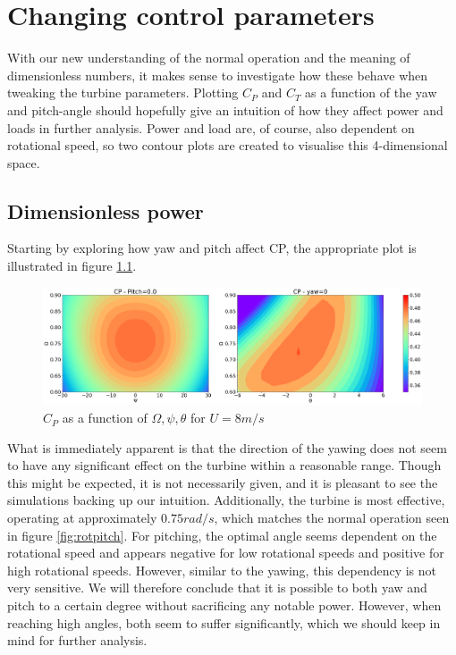 \chapter{Changing control parameters}

With our new understanding of the normal operation and the meaning of dimensionless numbers, it makes sense to investigate how these behave when tweaking the turbine parameters. Plotting $C_P$ and $C_T$ as a function of the yaw and pitch-angle should hopefully give an intuition of how they affect power and loads in further analysis. Power and load are, of course, also dependent on rotational speed, so two contour plots are created to visualise this 4-dimensional space. 

\section{Dimensionless power}
\label{dimensionless_power}

Starting by exploring how yaw and pitch affect CP, the appropriate plot is illustrated in figure \ref{fig:cpcontour}.

\begin{figure}[H]
    \centering
    \includegraphics[scale=0.23]{Illustrations/cpcontour.png}
    \caption{$C_P$ as a function of $\Omega, \psi, \theta$ for $U=8 m/s$}
    \label{fig:cpcontour}
\end{figure}

What is immediately apparent is that the direction of the yawing does not seem to have any significant effect on the turbine within a reasonable range. Though this might be expected, it is not necessarily given, and it is pleasant to see the simulations backing up our intuition. Additionally, the turbine is most effective, operating at approximately $0.75 rad/s$, which matches the normal operation seen in figure \ref{fig:rotpitch}. For pitching, the optimal angle seems dependent on the rotational speed and appears negative for low rotational speeds and positive for high rotational speeds. However, similar to the yawing, this dependency is not very sensitive. We will therefore conclude that it is possible to both yaw and pitch to a certain degree without sacrificing any notable power. However, when reaching high angles, both seem to suffer significantly, which we should keep in mind for further analysis.

